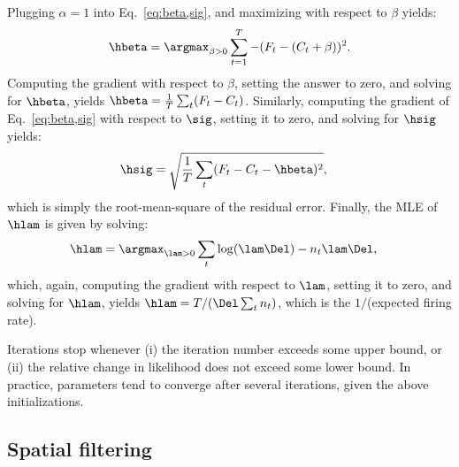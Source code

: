 Plugging $\alpha=1$ into Eq.~\eqref{eq:beta,sig}, and maximizing with respect to $\beta$ yields:
\begin{align}
\hbeta = \argmax_{\beta>0} \sum_{t=1}^T -(F_t - (C_t + \beta))^2.
\end{align}
\noindent Computing the gradient with respect to $\beta$, setting the answer to zero, and solving for $\hbeta$, yields $\hbeta = \frac{1}{T} \sum_t (F_t-C_t)$.  Similarly, computing the gradient of Eq.~\eqref{eq:beta,sig} with respect to $\sig$, setting it to zero, and solving for $\hsig$ yields:
\begin{align}
\hsig &= \sqrt{\frac{1}{T} \sum_t (F_t - C_t - \hbeta)^2},
\end{align}
which is simply the root-mean-square of the residual error.  Finally, the MLE of $\hlam$ is given by solving:
\begin{align}
\hlam &= \argmax_{\lam>0} \sum_t \log (\lam \Del) - n_t \lam \Del,
\end{align}
which, again, computing the gradient with respect to $\lam$, setting it to zero, and solving for $\hlam$, yields $\hlam=T/ (\Del \sum_t n_t)$, which is the $1/$(expected firing rate).


Iterations stop whenever (i) the iteration number exceeds some upper bound, or (ii) the relative change in likelihood does not exceed some lower bound.  In practice, parameters tend to converge after several iterations, given the above initializations. 


\subsection{Spatial filtering} \label{sec:methods:spatial}

